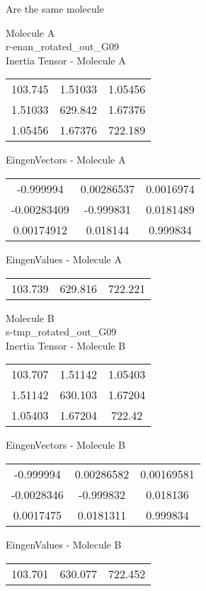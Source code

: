 \begin{center}
\vtab
\vtab
\textcolor{NavyBlue}{\Large Are the same molecule}
\end{center}
\newpage
\begin{multicols}{2}
\begin{center}
Molecule A \\ 
r-enan\_rotated\_out\_G09
\\
Inertia Tensor - Molecule A \\
\vtab
\begin{tabular}{|c c c|}
103.745	 & 	1.51033	 & 	1.05456	 \\
1.51033	 & 	629.842	 & 	1.67376	 \\
1.05456	 & 	1.67376	 & 	722.189
\end{tabular}

\vtab
 EingenVectors - Molecule A     \\
\vtab
\begin{tabular}{|c c c|}
-0.999994	 & 	0.00286537	 & 	0.0016974	 \\
-0.00283409	 & 	-0.999831	 & 	0.0181489	 \\
0.00174912	 & 	0.018144	 & 	0.999834
\end{tabular}

\vtab
 EingenValues - Molecule A     \\
\vtab
\begin{tabular}{|c c c|}
103.739	 & 	629.816	 & 	722.221
\end{tabular}
\columnbreak

Molecule B \\ 
s-tmp\_rotated\_out\_G09
\\
Inertia Tensor - Molecule B \\
\vtab
\begin{tabular}{|c c c|}
103.707	 & 	1.51142	 & 	1.05403	 \\
1.51142	 & 	630.103	 & 	1.67204	 \\
1.05403	 & 	1.67204	 & 	722.42
\end{tabular}

\vtab
 EingenVectors - Molecule B     \\
\vtab
\begin{tabular}{|c c c|}
-0.999994	 & 	0.00286582	 & 	0.00169581	 \\
-0.0028346	 & 	-0.999832	 & 	0.018136	 \\
0.0017475	 & 	0.0181311	 & 	0.999834
\end{tabular}

\vtab
 EingenValues - Molecule B     \\
\vtab
\begin{tabular}{|c c c|}
103.701	 & 	630.077	 & 	722.452
\end{tabular}

\end{center}
\end{multicols}
